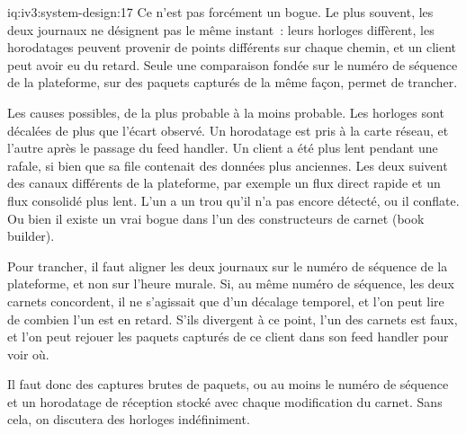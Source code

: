 \begin{solution}{iq:iv3:system-design:17}
Ce n'est pas forcément un bogue. Le plus souvent, les deux journaux ne désignent pas le même instant~: leurs horloges diffèrent, les horodatages peuvent provenir de points différents sur chaque chemin, et un client peut avoir eu du retard. Seule une comparaison fondée sur le numéro de séquence de la plateforme, sur des paquets capturés de la même façon, permet de trancher.

Les causes possibles, de la plus probable à la moins probable. Les horloges sont décalées de plus que l'écart observé. Un horodatage est pris à la carte réseau, et l'autre après le passage du feed handler. Un client a été plus lent pendant une rafale, si bien que sa file contenait des données plus anciennes. Les deux suivent des canaux différents de la plateforme, par exemple un flux direct rapide et un flux consolidé plus lent. L'un a un trou qu'il n'a pas encore détecté, ou il conflate. Ou bien il existe un vrai bogue dans l'un des constructeurs de carnet (book builder).

Pour trancher, il faut aligner les deux journaux sur le numéro de séquence de la plateforme, et non sur l'heure murale. Si, au même numéro de séquence, les deux carnets concordent, il ne s'agissait que d'un décalage temporel, et l'on peut lire de combien l'un est en retard. S'ils divergent à ce point, l'un des carnets est faux, et l'on peut rejouer les paquets capturés de ce client dans son feed handler pour voir où.

Il faut donc des captures brutes de paquets, ou au moins le numéro de séquence et un horodatage de réception stocké avec chaque modification du carnet. Sans cela, on discutera des horloges indéfiniment.

\end{solution}

